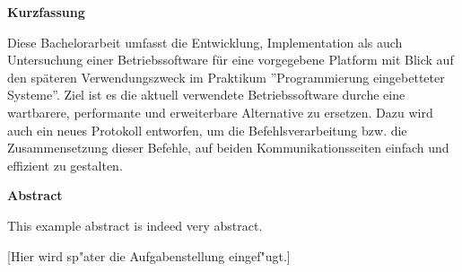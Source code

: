 \documentclass[11pt,twoside]{scrbook}
\begin{document}

\centerline{\bf Kurzfassung}

Diese Bachelorarbeit umfasst die Entwicklung, Implementation als auch Untersuchung einer
Betriebssoftware für eine vorgegebene Platform mit Blick auf den späteren Verwendungszweck
im Praktikum ''Programmierung eingebetteter Systeme''. Ziel ist es die aktuell verwendete
Betriebssoftware durche eine wartbarere, performante und erweiterbare Alternative zu
ersetzen. Dazu wird auch ein neues Protokoll entworfen, um die Befehlsverarbeitung bzw.
die Zusammensetzung dieser Befehle, auf beiden Kommunikationsseiten einfach und effizient
zu gestalten.

%
\vskip 3cm
%

\centerline{\bf Abstract}

This example abstract is indeed very abstract.

\cleardoublepage

\vspace*{7cm}
\centerline{[Hier wird sp"ater die Aufgabenstellung eingef"ugt.]}




\tableofcontents		%
\cleardoublepage
\listoffigures			%
\cleardoublepage
\listoftables			%
\cleardoublepage



\setcounter{page}{0}

\pagestyle{headings}


\cleardoublepage

\cleardoublepage

\cleardoublepage

\cleardoublepage
\cleardoublepage

\cleardoublepage

\cleardoublepage




\begin{appendix}

\cleardoublepage

\end{appendix}
\end{document}
